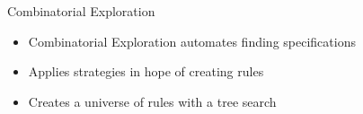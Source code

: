 \begin{frame}{Combinatorial Exploration}
    \begin{minipage}{0.5\textwidth}
    \begin{itemize}
        \item Combinatorial Exploration automates finding specifications
        \item Applies strategies in hope of creating rules
        \item Creates a universe of rules with a tree search
    \end{itemize}
    \end{minipage}
    \hfill
\end{frame}